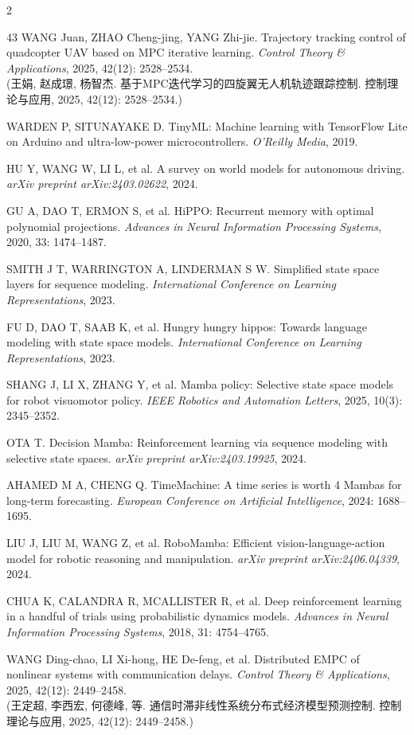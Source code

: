 \begin{multicols}{2}
{\begin{thebibliography}{43}
WANG Juan, ZHAO Cheng-jing, YANG Zhi-jie. Trajectory tracking control of quadcopter UAV based on MPC iterative learning. {\it Control Theory \& Applications}, 2025, 42(12): 2528--2534.\\(王娟, 赵成璟, 杨智杰. 基于MPC迭代学习的四旋翼无人机轨迹跟踪控制. 控制理论与应用, 2025, 42(12): 2528--2534.)

WARDEN P, SITUNAYAKE D. TinyML: Machine learning with TensorFlow Lite on Arduino and ultra-low-power microcontrollers. {\it O'Reilly Media}, 2019.

HU Y, WANG W, LI L, et al. A survey on world models for autonomous driving. {\it arXiv preprint arXiv:2403.02622}, 2024.

GU A, DAO T, ERMON S, et al. HiPPO: Recurrent memory with optimal polynomial projections. {\it Advances in Neural Information Processing Systems}, 2020, 33: 1474--1487.

SMITH J T, WARRINGTON A, LINDERMAN S W. Simplified state space layers for sequence modeling. {\it International Conference on Learning Representations}, 2023.

FU D, DAO T, SAAB K, et al. Hungry hungry hippos: Towards language modeling with state space models. {\it International Conference on Learning Representations}, 2023.

SHANG J, LI X, ZHANG Y, et al. Mamba policy: Selective state space models for robot visuomotor policy. {\it IEEE Robotics and Automation Letters}, 2025, 10(3): 2345--2352.

OTA T. Decision Mamba: Reinforcement learning via sequence modeling with selective state spaces. {\it arXiv preprint arXiv:2403.19925}, 2024.

AHAMED M A, CHENG Q. TimeMachine: A time series is worth 4 Mambas for long-term forecasting. {\it European Conference on Artificial Intelligence}, 2024: 1688--1695.

LIU J, LIU M, WANG Z, et al. RoboMamba: Efficient vision-language-action model for robotic reasoning and manipulation. {\it arXiv preprint arXiv:2406.04339}, 2024.

CHUA K, CALANDRA R, MCALLISTER R, et al. Deep reinforcement learning in a handful of trials using probabilistic dynamics models. {\it Advances in Neural Information Processing Systems}, 2018, 31: 4754--4765.

WANG Ding-chao, LI Xi-hong, HE De-feng, et al. Distributed EMPC of nonlinear systems with communication delays. {\it Control Theory \& Applications}, 2025, 42(12): 2449--2458.\\(王定超, 李西宏, 何德峰, 等. 通信时滞非线性系统分布式经济模型预测控制. 控制理论与应用, 2025, 42(12): 2449--2458.)


\end{thebibliography}}
\end{multicols}
